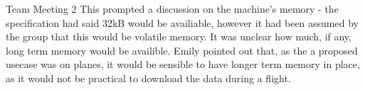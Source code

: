 \documentclass{article}
\begin{document}
\begin{Minutes}{Team Meeting 2}
This prompted a discussion on the machine's memory - the specification had said 32kB would be availiable,
however it had been assumed by the group that this would be volatile memory. It was unclear how much, if
any, long term memory would be availible. Emily pointed out that, as the a proposed usecase was on planes,
it would be sensible to have longer term memory in place, as it would not be practical to download the data
during a flight.

\end{Minutes}
\end{document}
